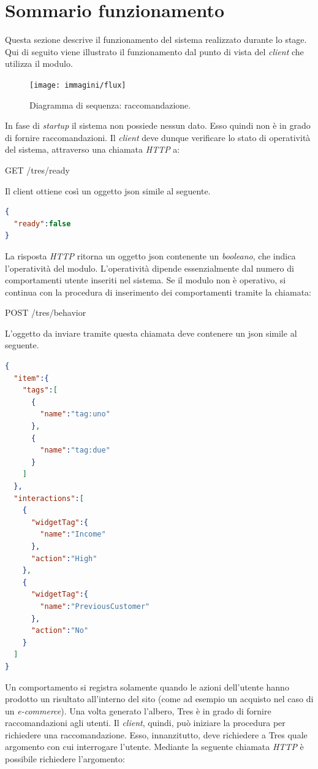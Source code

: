 \section{Sommario funzionamento}
Questa sezione descrive il funzionamento del sistema realizzato durante lo stage. Qui di seguito viene illustrato il funzionamento dal punto di vista del \emph{client} che utilizza il modulo.
\begin{figure}[h]
\centering
\texttt{[image: immagini/flux]}
\caption{Diagramma di sequenza: raccomandazione.}
\label{fig:flux}
\end{figure}
\newpage
In fase di \emph{startup} il sistema non possiede nessun dato. Esso quindi non è in grado di fornire raccomandazioni. Il \emph{client} deve dunque verificare lo stato di operatività del sistema, attraverso una chiamata \emph{HTTP} a:\\
\begin{center}
GET    /tres/ready
\end{center}
Il client ottiene così un oggetto \gls{json} simile al seguente.
\begin{lstlisting}[language=json,firstnumber=1]
{
  "ready":false
}
\end{lstlisting}
La risposta \emph{HTTP} ritorna un oggetto \gls{json} contenente un \emph{booleano}, che indica l'operatività del modulo. L'operatività dipende essenzialmente dal numero di comportamenti utente inseriti nel sistema. Se il modulo non è operativo, si continua con la procedura di inserimento dei comportamenti tramite la chiamata:
\begin{center}
POST    /tres/behavior
\end{center}
L'oggetto da inviare tramite questa chiamata deve contenere un \gls{json} simile al seguente.
\begin{lstlisting}[language=json,firstnumber=1]
{
  "item":{
    "tags":[
      {
        "name":"tag:uno"
      },
      {
        "name":"tag:due"
      }
    ]
  },
  "interactions":[
    {
      "widgetTag":{
        "name":"Income"
      },
      "action":"High"
    },
    {
      "widgetTag":{
        "name":"PreviousCustomer"
      },
      "action":"No"
    }
  ]
}
\end{lstlisting}
Un comportamento si registra solamente quando le azioni dell'utente hanno prodotto un risultato all'interno del sito (come ad esempio un acquisto nel caso di un \emph{e-commerce}). Una volta generato l'albero, Tres è in grado di fornire raccomandazioni agli utenti. Il \emph{client}, quindi, può iniziare la procedura per richiedere una raccomandazione. Esso, innanzitutto, deve richiedere a Tres quale argomento con cui interrogare l'utente. Mediante la seguente chiamata \emph{HTTP} è possibile richiedere l'argomento: 
